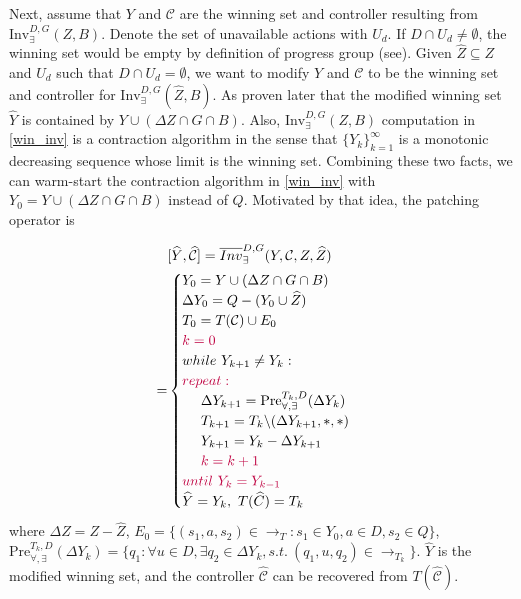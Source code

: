 Next, assume that $ Y $ and $ \mathcal{C} $ are the winning set and controller resulting from $ \text{Inv}_{\exists}^{D,G}(Z,B) $. Denote the set of unavailable actions with $ U_d $. If $ D\cap U_d \not= \emptyset$, the winning set would be empty by definition of progress group (see\cite{Nilsson2017}). Given $ \widehat{Z} \subseteq Z $ and $U_d$ such that $ D\cap U_d=\emptyset $, we want to modify $ Y $ and $ \mathcal{C} $ to be the winning set and controller for $ \text{Inv}_{\exists}^{D,G}(\widehat{Z}, B) $. As proven later that the modified winning set $\widehat{Y}$ is contained by $ Y\cup (\Delta Z\cap G\cap B) $. Also, $ \text{Inv}_{\exists}^{D,G}(Z,B) $ computation in \eqref{win_inv} is a contraction algorithm in the sense that $ \{Y_k\}_{k=1}^{\infty} $ is a monotonic decreasing sequence whose limit is the winning set. Combining these two facts, we can warm-start the contraction algorithm in \eqref{win_inv} with $ Y_0=Y\cup (\Delta Z\cap G\cap B)$ instead of $ Q $. Motivated by that idea, the patching operator is

\begin{align}
&[\widehat{Y},\widehat{\mathcal{C}}]=\overline{Inv}_{\exists}^{D,G}(Y,\mathcal{C},Z,\widehat{Z}) \\
=&\begin{cases}
Y_0 = Y\cup (\Delta Z\cap G \cap B)\\
\Delta Y_0 = Q - (Y_0 \cup \widehat{Z})\\
T_0  = T(\mathcal{C})\cup E_0\\
{\color{purple} k=0}\\
while \ Y_{k+1}\not= Y_k:\\
{\color{purple} repeat:}\\
\ \ \ \ \Delta Y_{k+1} = \text{Pre}_{\forall,\exists}^{T_k,D}(\Delta Y_k) \\
\ \ \ \ T_{k+1} = T_{k}\backslash (\Delta Y_{k+1},*,*)\\
\ \ \ \ Y_{k+1} = Y_k- \Delta Y_{k+1}\\
\ \ \ \ {\color{purple} k=k+1}\\
{\color{purple} until \ Y_k = Y_{k-1}}\\
\widehat{Y}=Y_k,\ T(\widehat{C}) = T_{k}
\end{cases}\label{patch_inv}
\end{align}
where $ \Delta Z = Z - \widehat{Z} $, $ E_0 = \{(s_1,a,s_2)\in \rightarrow_{T}: s_1\in Y_0, a\in D, s_2 \in Q\} $, $ \text{Pre}_{\forall,\exists}^{T_k,D}(\Delta Y_k) = \{q_1: \forall u\in D, \exists q_2\in \Delta Y_k, s.t.\ (q_1, u, q_2) \in \rightarrow_{T_k} \} $. $ \widehat{Y} $ is the modified winning set, and the controller $ \widehat{\mathcal{C}} $ can be recovered from $ T(\widehat{\mathcal{C}}) $.

